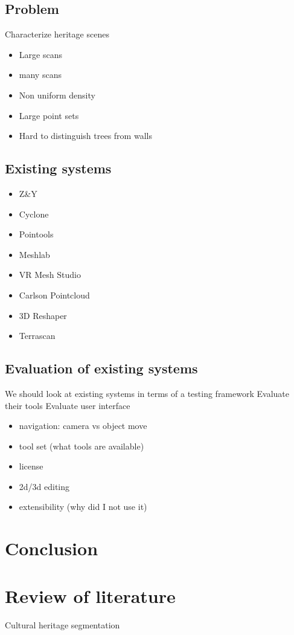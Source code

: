 	\subsection{Problem}
	Characterize heritage scenes
	\begin{itemize}
		\item Large scans
		\item many scans
		\item Non uniform density
		\item Large point sets
		\item Hard to distinguish trees from walls
	\end{itemize}

	\subsection{Existing systems}
		\begin{itemize}
			\item Z\&Y
			\item Cyclone
			\item Pointools
			\item Meshlab
			\item VR Mesh Studio
			\item Carlson Pointcloud
			\item 3D Reshaper
			\item Terrascan
		\end{itemize}

	\subsection{Evaluation of existing systems}
	We should look at existing systems in terms of a testing framework
	Evaluate their tools
	Evaluate user interface
	\begin{itemize}
		\item navigation: camera vs object move
		\item tool set (what tools are available)
		\item license
		\item 2d/3d editing
		\item extensibility (why did I not use it)
	\end{itemize}

		

\section{Conclusion}



\section{Review of literature}

\cite{Spina2010} Cultural heritage segmentation

